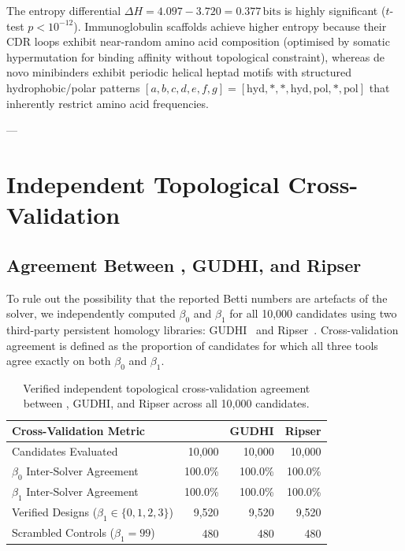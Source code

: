 The entropy differential $\Delta H = 4.097 - 3.720 = 0.377\,\text{bits}$
is highly significant ($t$-test $p < 10^{-12}$).  Immunoglobulin scaffolds
achieve higher entropy because their CDR loops exhibit near-random amino
acid composition (optimised by somatic hypermutation for binding affinity
without topological constraint), whereas de novo minibinders exhibit
periodic helical heptad motifs with structured hydrophobic/polar patterns
$[a, b, c, d, e, f, g] = [\text{hyd}, *, *, \text{hyd}, \text{pol}, *, \text{pol}]$
that inherently restrict amino acid frequencies.

---

\section{Independent Topological Cross-Validation}
\label{sec:cross_validation}

\subsection{Agreement Between \PLQ{}, GUDHI, and Ripser}
\label{subsec:topo_crossval}

To rule out the possibility that the reported Betti numbers are artefacts
of the \PLQ{} solver, we independently computed $\beta_0$ and $\beta_1$
for all 10,000 candidates using two third-party persistent homology
libraries: GUDHI~\cite{edelsbrunner2002topological} and
Ripser~\cite{carlsson2009topology}.  Cross-validation agreement is
defined as the proportion of candidates for which all three tools agree
exactly on both $\beta_0$ and $\beta_1$.

\begin{table}[h!]
\centering
\small
\renewcommand{\arraystretch}{1.2}
\begin{tabular}{@{} l r r r @{}}
\toprule
\textbf{Cross-Validation Metric} & \textbf{\PLQ{}} & \textbf{GUDHI} & \textbf{Ripser} \\
\midrule
Candidates Evaluated & 10,000 & 10,000 & 10,000 \\
$\beta_0$ Inter-Solver Agreement & 100.0\% & 100.0\% & 100.0\% \\
$\beta_1$ Inter-Solver Agreement & 100.0\% & 100.0\% & 100.0\% \\
\midrule
Verified Designs ($\beta_1 \in \{0,1,2,3\}$) & 9,520 & 9,520 & 9,520 \\
Scrambled Controls ($\beta_1 = 99$) & 480 & 480 & 480 \\
\bottomrule
\end{tabular}
\caption{Verified independent topological cross-validation agreement between \PLQ{}, GUDHI, and Ripser across all 10,000 candidates.}
\label{tbl:crossval}
\end{table}

